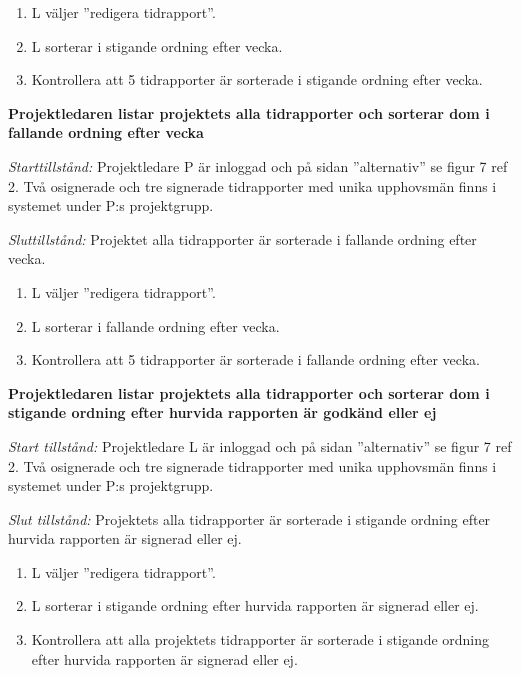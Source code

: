 \documentclass[a4paper]{article}
\begin{document}
\begin{FT}
\begin{enumerate}
\item L väljer ''redigera tidrapport''.
\item L sorterar i stigande ordning efter vecka.
\item Kontrollera att 5 tidrapporter är sorterade i stigande ordning efter vecka.
\end{enumerate}


\item %
\textbf{Projektledaren listar projektets alla tidrapporter och sorterar dom i fallande ordning efter vecka} 

\emph{Starttillstånd:} Projektledare P är inloggad och på sidan ''alternativ'' se figur 7 ref 2. Två osignerade och tre signerade tidrapporter med unika upphovsmän finns i systemet under P:s projektgrupp.

\emph{Sluttillstånd:} Projektet alla tidrapporter är sorterade i fallande ordning efter vecka.

\begin{enumerate}
\item L väljer ''redigera tidrapport''.
\item L sorterar i fallande ordning efter vecka.
\item Kontrollera att 5 tidrapporter är sorterade i fallande ordning efter vecka.
\end{enumerate}

\item %
\textbf{Projektledaren listar projektets alla tidrapporter och sorterar dom i stigande ordning efter hurvida rapporten är godkänd eller ej}

\emph{Start tillstånd:} Projektledare L är inloggad och på sidan ''alternativ'' se figur 7 ref 2. Två osignerade och tre signerade tidrapporter med unika upphovsmän finns i systemet under P:s projektgrupp.

\emph{Slut tillstånd:} Projektets alla tidrapporter är sorterade i stigande ordning efter hurvida rapporten är signerad eller ej.

\begin{enumerate}
\item L väljer ''redigera tidrapport''.
\item L sorterar i stigande ordning efter hurvida rapporten är signerad eller ej.
\item Kontrollera att alla projektets tidrapporter är sorterade i stigande ordning efter hurvida rapporten är signerad eller ej.
\end{enumerate}


\end{FT}
\end{document}

